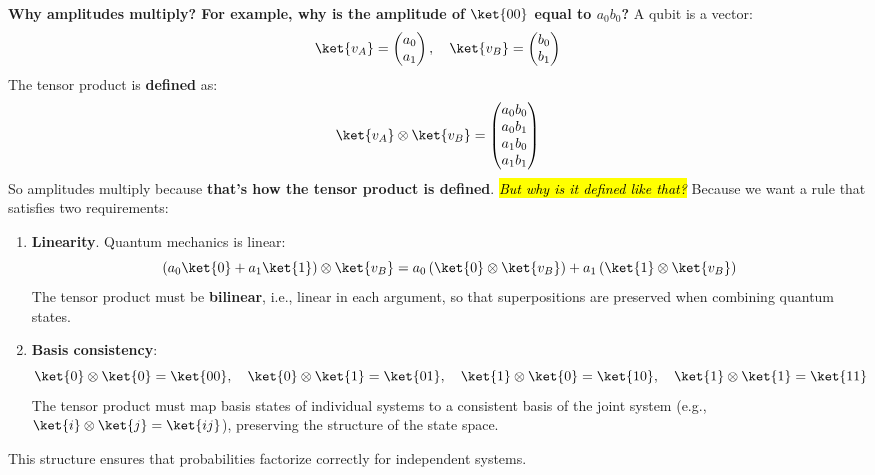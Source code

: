 \highspace
\textcolor{Green3}{ \textbf{Why amplitudes multiply? For example, why is the amplitude of $\ket{00}$ equal to $a_0b_0$?}} A qubit is a vector:
\begin{equation*}
    \ket{v_{A}} = \begin{pmatrix}
        a_{0} \\
        a_{1}
    \end{pmatrix},
    \quad
    \ket{v_{B}} = \begin{pmatrix}
        b_{0} \\
        b_{1}
    \end{pmatrix}
\end{equation*}
The tensor product is \textbf{defined} as:
\begin{equation}
    \ket{v_{A}} \otimes \ket{v_{B}} = \begin{pmatrix}
        a_{0}b_{0} \\
        a_{0}b_{1} \\
        a_{1}b_{0} \\
        a_{1}b_{1}
    \end{pmatrix}
\end{equation}
So amplitudes multiply because \textbf{that's how the tensor product is defined}. \hl{\emph{But why is it defined like that?}} Because we want a rule that satisfies two requirements:
\begin{enumerate}
    \item \textbf{Linearity}. Quantum mechanics is linear:
    \begin{equation*}
        \left(a_{0} \ket{0} + a_{1} \ket{1}\right) \otimes \ket{v_{B}} = a_{0} \left(\ket{0} \otimes \ket{v_{B}}\right) + a_{1} \left(\ket{1} \otimes \ket{v_{B}}\right)
    \end{equation*}
    The tensor product must be \textbf{bilinear}, i.e., linear in each argument, so that superpositions are preserved when combining quantum states.
    \item \textbf{Basis consistency}:
    \begin{equation*}
        \ket{0} \otimes \ket{0} = \ket{00}, \quad \ket{0} \otimes \ket{1} = \ket{01}, \quad \ket{1} \otimes \ket{0} = \ket{10}, \quad \ket{1} \otimes \ket{1} = \ket{11}
    \end{equation*}
    The tensor product must map basis states of individual systems to a consistent basis of the joint system (e.g., $\ket{i} \otimes \ket{j} = \ket{ij}$), preserving the structure of the state space.
\end{enumerate}
This structure ensures that probabilities factorize correctly for independent systems.

